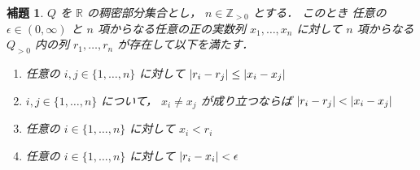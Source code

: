 \documentclass[leqno, 12pt]{jsarticle}
\newtheorem{lem}[thm]{補題}
\newcommand{\zz}{\mathbb{Z}}
\newcommand{\rr}{\mathbb{R}}
\DeclarePairedDelimiter{\abs}{\lvert}{\rvert}
\newcommand{\pospart}[1]{#1_{>0}}
\newcommand{\zzpos}{\pospart{\zz}}
\begin{document}
\begin{lem}\label{lem:katetov:kinjidaiji}
$Q$
を
$\rr$
の稠密部分集合とし，
$n\in \zzpos$
とする．
このとき
任意の
$\epsilon\in (0, \infty)$%
と
$n$
項からなる任意の正の実数列
$x_{1}, \dots, x_{n}$
に対して
$n$%
項からなる
$\pospart{Q}$
内の列
$r_{1}, \dots, r_{n}$
が存在して以下を満たす．
\begin{enumerate}[label=\textup{(\arabic*)}]
\item
任意の
$i, j\in \{1, \dots, n\}$
に対して
$\abs{r_{i}-r_{j}}\le \abs{x_{i}-x_{j}}$
\item
$i, j\in \{1, \dots, n\}$
について，
$x_{i}\neq x_{j}$
が成り立つならば
$\abs{r_{i}-r_{j}}<\abs{x_{i}-x_{j}}$
\item
任意の
$i\in \{1, \dots, n\}$
に対して
$x_{i}<r_{i}$
\item
任意の
$i\in \{1, \dots, n\}$
に対して
$\abs{r_{i}-x_{i}}<\epsilon$
\end{enumerate}

\end{lem}
\end{document}
